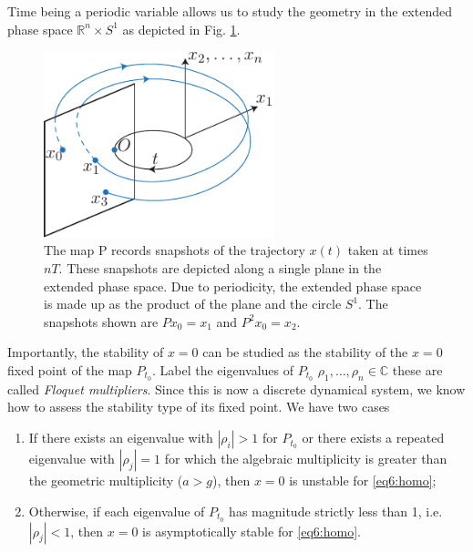 Time being a periodic variable allows us to study the geometry in the extended phase space $\mathbb{R}^{n}\times S^{1}$ as depicted in Fig. \ref{fig:poinc_geom}.
\begin{figure}[h!]
	\centering
	\includegraphics[width=0.6\textwidth]{figures/ch5/1poinc_geom.pdf}
	\caption{The map P records snapshots of the trajectory $x(t)$ taken at times $nT$. These snapshots are depicted along a single plane in the extended phase space. Due to periodicity, the extended phase space is made up as the product of the plane and the circle $S^1$. The snapshots shown are $Px_0 = x_1$ and $P^2 x_0 = x_2$.}
	\label{fig:poinc_geom}
\end{figure}
Importantly, the stability of $x=0$ can be studied as the stability of the $x=0$ fixed point of the map $P_{t_0}$. Label the eigenvalues of $P_{t_0}$ $\rho_1,\ldots,\rho_n\in\mathbb{C}$ these are called \emph{Floquet multipliers}. Since this is now a discrete dynamical system, we know how to assess the stability type of its fixed point. We have two cases
\begin{enumerate}
	\item If there exists an eigenvalue with $|\rho_i|>1$ for $P_{t_0}$ or there exists a repeated eigenvalue with $|\rho_j|=1$ for which the algebraic multiplicity is greater than the geometric multiplicity ($a>g$), then $x=0$ is unstable for \eqref{eq6:homo};
	\item Otherwise, if each eigenvalue of $P_{t_0}$ has magnitude strictly less than 1, i.e. $|\rho_j|<1$, then $x=0$ is asymptotically stable for \eqref{eq6:homo}.
\end{enumerate}

